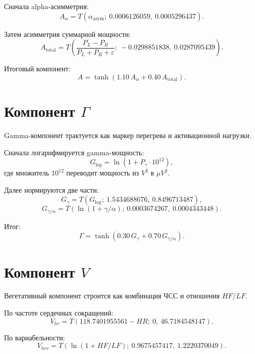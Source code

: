 \documentclass[12pt,a4paper]{article}
\begin{document}
Сначала alpha-асимметрия:
\begin{equation}
A_{\alpha}=T(\alpha_{\mathrm{asym}};\ 0.0006126059,\ 0.0005296437).
\end{equation}

Затем асимметрия суммарной мощности:
\begin{equation}
A_{\mathrm{total}}=
T\!\left(
\frac{P_L-P_R}{P_L+P_R+\varepsilon};\
-0.0298851838,\ 0.0287095439
\right).
\end{equation}

Итоговый компонент:
\begin{equation}
A=\tanh\!\left(1.10\,A_{\alpha}+0.40\,A_{\mathrm{total}}\right).
\end{equation}

\section{Компонент \(\Gamma\)}
Gamma-компонент трактуется как маркер перегрева и активационной нагрузки.

Сначала логарифмируется gamma-мощность:
\begin{equation}
G_{\log}=\ln(1+P_{\gamma}\cdot 10^{12}),
\end{equation}
где множитель $10^{12}$ переводит мощность из $V^2$ в $\mu V^2$.

Далее нормируются две части:
\begin{equation}
G_{\gamma}=T(G_{\log};\ 1.5434688676,\ 0.8496713487),
\end{equation}
\begin{equation}
G_{\gamma/\alpha}=T(\ln(1+\gamma/\alpha);\ 0.0003674267,\ 0.0004343448).
\end{equation}

Итог:
\begin{equation}
\Gamma=\tanh\!\left(0.30\,G_{\gamma}+0.70\,G_{\gamma/\alpha}\right).
\end{equation}

\section{Компонент \(V\)}
Вегетативный компонент строится как комбинация ЧСС и отношения $HF/LF$.

По частоте сердечных сокращений:
\begin{equation}
V_{hr}=T(118.7401955561-HR;\ 0,\ 46.7184548147).
\end{equation}

По вариабельности:
\begin{equation}
V_{hrv}=T(\ln(1+HF/LF);\ 0.9675457417,\ 1.2220370049).
\end{equation}
\end{document}
